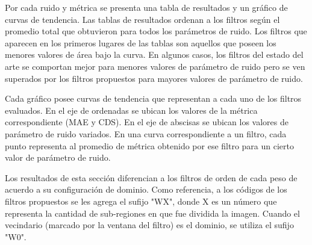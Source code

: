 Por cada ruido y métrica se presenta una tabla de resultados y un gráfico de curvas de tendencia. Las tablas de resultados ordenan a los filtros según el promedio total que obtuvieron para todos los parámetros de ruido. Los filtros que aparecen en los primeros lugares de las tablas son aquellos que poseen los menores valores de área bajo la curva. En algunos casos, los filtros del estado del arte se comportan mejor para menores valores de parámetro de ruido pero se ven superados por los filtros propuestos para mayores valores de parámetro de ruido. 

Cada gráfico posee curvas de tendencia que representan a cada uno de los filtros evaluados. En el eje de ordenadas se ubican los valores de la métrica correspondiente (MAE y CDS). En el eje de abscisas se ubican los valores de parámetro de ruido variados. En una curva correspondiente a un filtro, cada punto representa al promedio de métrica obtenido por ese filtro para un cierto valor de parámetro de ruido.

Los resultados de esta sección diferencian a los filtros de orden de cada peso de acuerdo a su configuración de dominio. Como referencia, a los códigos de los filtros propuestos se les agrega el sufijo "WX", donde X es un número que representa la cantidad de sub-regiones en que fue dividida la imagen. Cuando el vecindario (marcado por la ventana del filtro) es el dominio, se utiliza el sufijo "W0".





\pgfplotstablegetcolsof{\ventanasmaegaussian}
\pgfplotstablegetrowsof{\ventanasmaegaussian}


